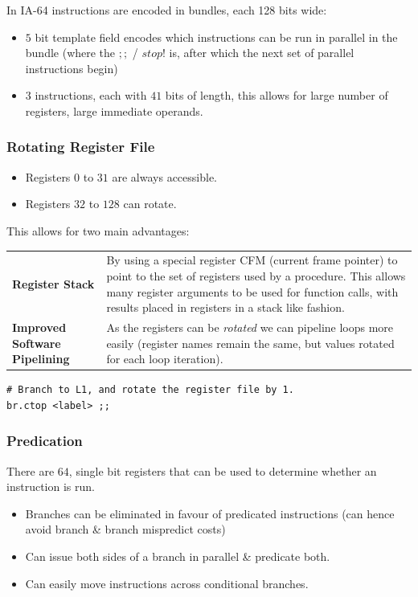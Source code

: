 In IA-64 instructions are encoded in bundles, each 128 bits wide:
\begin{itemize}
	\item $5$ bit template field encodes which instructions can be run in parallel in the bundle (where the $;;$ / $stop!$ is, after which the next set of parallel instructions begin)
	\item $3$ instructions, each with $41$ bits of length, this allows for large number of registers, large immediate operands.
\end{itemize}
\subsubsection{Rotating Register File}
\begin{itemize}
	\item Registers $0$ to $31$ are always accessible.
	\item Registers $32$ to $128$ can rotate.
\end{itemize}
This allows for two main advantages:
\begin{center}
	\begin{tabular}{p{} p{}}
		\textbf{Register Stack}                        & By using a special register CFM (current frame pointer) to point to the set of registers used by a procedure. This allows many register arguments to be used for function calls, with results placed in registers in a stack like fashion. \\
		\textbf{Improved \newline Software Pipelining} & As the registers can be \textit{rotated} we can pipeline loops more easily (register names remain the same, but values rotated for each loop iteration).                                                                                   \\
	\end{tabular}
\end{center}
\begin{verbatim}
# Branch to L1, and rotate the register file by 1.
br.ctop <label> ;;
\end{verbatim}

\subsubsection{Predication}
There are $64$, single bit registers that can be used to determine whether an instruction is run.
\begin{itemize}
	\item Branches can be eliminated in favour of predicated instructions (can hence avoid branch \& branch mispredict costs)
	\item Can issue both sides of a branch in parallel \& predicate both.
	\item Can easily move instructions across conditional branches.
\end{itemize}

